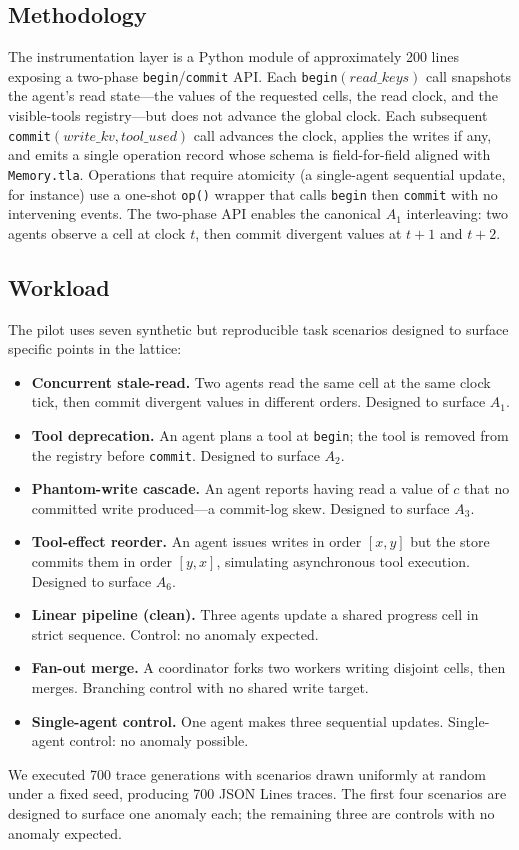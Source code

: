 \documentclass[journal,compsoc,10pt]{IEEEtran}
\theoremstyle{definition}
\theoremstyle{remark}
\newcommand{\fld}[1]{\mathit{#1}}
\begin{document}
\subsection{Methodology}
\label{sec:method}
The instrumentation layer is a Python module of approximately 200
lines exposing a two-phase \texttt{begin}/\texttt{commit} API. Each
\texttt{begin}$(\fld{read\_keys})$ call snapshots the agent's read
state---the values of the requested cells, the read clock, and the
visible-tools registry---but does not advance the global clock.
Each subsequent
\texttt{commit}$(\fld{write\_kv}, \fld{tool\_used})$ call advances
the clock, applies the writes if any, and emits a single operation
record whose schema is field-for-field aligned with
\texttt{Memory.tla}. Operations that require atomicity (a
single-agent sequential update, for instance) use a one-shot
\texttt{op()} wrapper that calls \texttt{begin} then \texttt{commit}
with no intervening events. The two-phase API enables the canonical
$A_1$ interleaving: two agents observe a cell at clock $t$, then
commit divergent values at $t{+}1$ and $t{+}2$.

\subsection{Workload}
\label{sec:workload}
The pilot uses seven synthetic but reproducible task scenarios
designed to surface specific points in the lattice:
\begin{itemize}
    \item \textbf{Concurrent stale-read.} Two agents read the same
    cell at the same clock tick, then commit divergent values in
    different orders. Designed to surface $A_1$.
    \item \textbf{Tool deprecation.} An agent plans a tool at
    \texttt{begin}; the tool is removed from the registry before
    \texttt{commit}. Designed to surface $A_2$.
    \item \textbf{Phantom-write cascade.} An agent reports having
    read a value of $c$ that no committed write produced---a
    commit-log skew. Designed to surface $A_3$.
    \item \textbf{Tool-effect reorder.} An agent issues writes in
    order $[x, y]$ but the store commits them in order $[y, x]$,
    simulating asynchronous tool execution. Designed to surface
    $A_6$.
    \item \textbf{Linear pipeline (clean).} Three agents update a
    shared progress cell in strict sequence. Control: no anomaly
    expected.
    \item \textbf{Fan-out merge.} A coordinator forks two workers
    writing disjoint cells, then merges. Branching control with no
    shared write target.
    \item \textbf{Single-agent control.} One agent makes three
    sequential updates. Single-agent control: no anomaly possible.
\end{itemize}
We executed 700 trace generations with scenarios drawn uniformly at
random under a fixed seed, producing 700 JSON Lines traces. The first
four scenarios are designed to surface one anomaly each; the
remaining three are controls with no anomaly expected.
\end{document}
